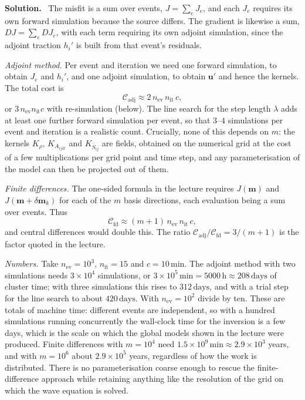 \documentclass[a4paper,12pt]{paper}
\newenvironment{solution}{\par\noindent\textbf{Solution.}\ }{\par\medskip}
\begin{document}
\begin{solution}
The misfit is a sum over events, $J=\sum_{e}J_{e}$, and each $J_{e}$ requires its own forward simulation because the source
differs. The gradient is likewise a sum, $DJ=\sum_{e}DJ_{e}$, with each term requiring its own adjoint simulation, since the
adjoint traction $h_{i}'$ is built from that event's residuals.

\emph{Adjoint method.} Per event and iteration we need one forward simulation, to obtain $J_{e}$ and $h_{i}'$, and one
adjoint simulation, to obtain $\mathbf{u}'$ and hence the kernels. The total cost is
\begin{equation}
\mathcal{C}_{\mathrm{adj}}\approx2\,n_{\mathrm{ev}}\,n_{\mathrm{it}}\,c,
\label{eq:33}
\end{equation}
or $3\,n_{\mathrm{ev}}n_{\mathrm{it}}c$ with re-simulation (below). The line search for the step length $\lambda$ adds at
least one further forward simulation per event, so that $3$--$4$ simulations per event and iteration is a realistic count.
Crucially, none of this depends on $m$: the kernels $K_{\rho}$, $K_{A_{ijkl}}$ and $K_{\overline{S}_{ij}}$ are fields,
obtained on the numerical grid at the cost of a few multiplications per grid point and time step, and any parameterisation of
the model can then be projected out of them.

\emph{Finite differences.} The one-sided formula in the lecture requires $J(\mathbf{m})$ and $J(\mathbf{m}+\delta\mathbf{m}_{k})$
for each of the $m$ basis directions, each evaluation being a sum over events. Thus
\begin{equation}
\mathcal{C}_{\mathrm{fd}}\approx(m+1)\,n_{\mathrm{ev}}\,n_{\mathrm{it}}\,c,
\label{eq:34}
\end{equation}
and central differences would double this. The ratio $\mathcal{C}_{\mathrm{adj}}/\mathcal{C}_{\mathrm{fd}}=3/(m+1)$ is the
factor quoted in the lecture.

\emph{Numbers.} Take $n_{\mathrm{ev}}=10^{3}$, $n_{\mathrm{it}}=15$ and $c=10\,\mathrm{min}$. The adjoint method with two
simulations needs $3\times10^{4}$ simulations, or $3\times10^{5}\,\mathrm{min}=5000\,\mathrm{h}\approx208\,\mathrm{days}$
of cluster time; with three simulations this rises to $312\,\mathrm{days}$, and with a trial step for the line search to
about $420\,\mathrm{days}$. With $n_{\mathrm{ev}}=10^{2}$ divide by ten. These are totals of machine time: different events
are independent, so with a hundred simulations running concurrently the wall-clock time for the inversion is a few days,
which is the scale on which the global models shown in the lecture were produced. Finite differences with $m=10^{4}$ need
$1.5\times10^{9}\,\mathrm{min}\approx2.9\times10^{3}$ years, and with $m=10^{6}$ about $2.9\times10^{5}$ years, regardless
of how the work is distributed. There is no parameterisation coarse enough to rescue the finite-difference approach while
retaining anything like the resolution of the grid on which the wave equation is solved.


\end{solution}
\end{document}

